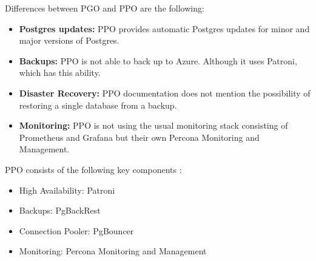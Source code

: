 Differences between PGO and PPO are the following:
\begin{itemize}
    \item \textbf{Postgres updates:} PPO provides automatic Postgres updates for minor and major versions of Postgres.  \cite{PerconaDocuUpdate}
    \item \textbf{Backups:} PPO is not able to back up to Azure. \cite{PerconaDocuCompare} Although it uses Patroni, which has this ability.
    \item \textbf{Disaster Recovery:} PPO documentation does not mention the possibility of restoring a single database from a backup. \cite{PerconaDocuBackups}
    \item \textbf{Monitoring:} PPO is not using the usual monitoring stack consisting of Prometheus and Grafana but their own Percona Monitoring and Management. \cite{PerconaDocuMonitoring}
\end{itemize}




PPO consists of the following key components \cite{PostgresOnKubernetes}:
\begin{itemize}
    \item High Availability: Patroni
    \item Backups: PgBackRest
    \item Connection Pooler: PgBouncer
    \item Monitoring: Percona Monitoring and Management
\end{itemize}


